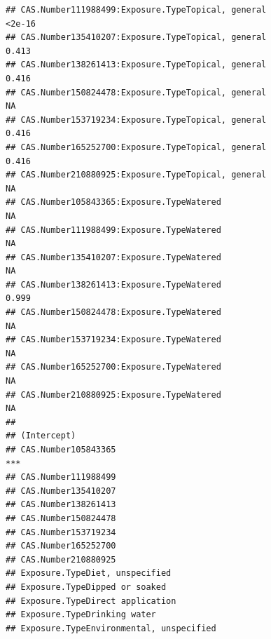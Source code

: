 \documentclass[
  12pt,
]{article}
\begin{document}
\begin{verbatim}
## CAS.Number111988499:Exposure.TypeTopical, general                                 <2e-16
## CAS.Number135410207:Exposure.TypeTopical, general                                  0.413
## CAS.Number138261413:Exposure.TypeTopical, general                                  0.416
## CAS.Number150824478:Exposure.TypeTopical, general                                     NA
## CAS.Number153719234:Exposure.TypeTopical, general                                  0.416
## CAS.Number165252700:Exposure.TypeTopical, general                                  0.416
## CAS.Number210880925:Exposure.TypeTopical, general                                     NA
## CAS.Number105843365:Exposure.TypeWatered                                              NA
## CAS.Number111988499:Exposure.TypeWatered                                              NA
## CAS.Number135410207:Exposure.TypeWatered                                              NA
## CAS.Number138261413:Exposure.TypeWatered                                           0.999
## CAS.Number150824478:Exposure.TypeWatered                                              NA
## CAS.Number153719234:Exposure.TypeWatered                                              NA
## CAS.Number165252700:Exposure.TypeWatered                                              NA
## CAS.Number210880925:Exposure.TypeWatered                                              NA
##                                                                                    
## (Intercept)                                                                        
## CAS.Number105843365                                                             ***
## CAS.Number111988499                                                                
## CAS.Number135410207                                                                
## CAS.Number138261413                                                                
## CAS.Number150824478                                                                
## CAS.Number153719234                                                                
## CAS.Number165252700                                                                
## CAS.Number210880925                                                                
## Exposure.TypeDiet, unspecified                                                     
## Exposure.TypeDipped or soaked                                                      
## Exposure.TypeDirect application                                                    
## Exposure.TypeDrinking water                                                        
## Exposure.TypeEnvironmental, unspecified                                            

\end{verbatim}
\end{document}
